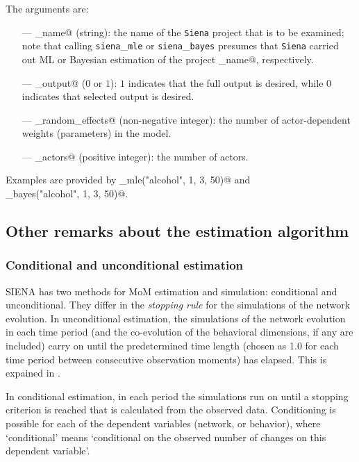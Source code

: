 \documentclass[a4paper,fleqn,11pt]{article}
\newcommand{\+}{\, + \,}
\newcommand{\SI}{{\sf SIENA }}
\begin{document}
The arguments are:
\begin{itemize}
\item[---] \verb@project_name@ (string): the name of the {\tt Siena} project
that is to be examined;
note that calling {\tt siena}\_{\tt mle} or {\tt siena}\_{\tt bayes} presumes
that {\tt Siena} carried out ML or Bayesian estimation of the
project \verb@project_name@, respectively.
\item[---] \verb@full_output@ ($0$ or $1$): $1$ indicates that the full output is desired,
while $0$ indicates that selected output is desired.
\item[---] \verb@no_random_effects@ (non-negative integer): the number of
actor-dependent weights (parameters) in the model.
\item[---] \verb@no_actors@ (positive integer): the number of actors.
\end{itemize}
Examples are provided by \verb@siena_mle("alcohol", 1, 3, 50)@ and\\
\verb@siena_bayes("alcohol", 1, 3, 50)@.

\fi

\subsection{Other remarks about the estimation algorithm}

\subsubsection{Conditional and unconditional estimation}
\label{S_cond}

\SI has two methods for MoM estimation and simulation:
\hypertarget{T_S_cond}{conditional and unconditional}. They differ
in the {\em stopping rule} for the simulations of the network
evolution. In unconditional estimation, the simulations of the
network evolution in each time period (and the co-evolution of the
behavioral dimensions, if any are included) carry on until the
predetermined time length (chosen as 1.0
for each time period between consecutive observation moments) has elapsed.
This is expained in \citet[][Section 4.2]{Snijders01}.

In conditional estimation, in each period
the simulations run on until a stopping
criterion is reached that is calculated from the observed data.
Conditioning is possible for each of the dependent variables
(network, or behavior), where `conditional' means `conditional on
the observed number of changes on this dependent variable'.
\end{document}
